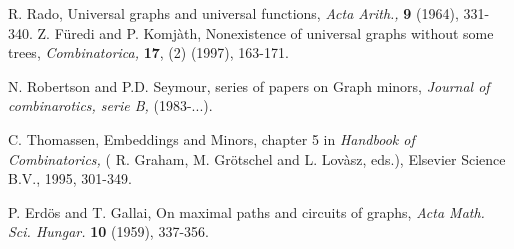\documentclass{llncs}
\begin{document}
\begin{thebibliography}{9}
 R. Rado, Universal graphs and universal functions, \textit{Acta Arith.,} \textbf{9} (1964),
331-340.
 Z. F\"{u}redi and P. Komj\`{a}th, Nonexistence of universal graphs
without some trees, \textit{Combinatorica, }\textbf{17}, (2)
(1997), 163-171.

 N. Robertson and P.D. Seymour, series of papers on Graph
minors, \textit{Journal of combinarotics, serie B, }(1983-...).

 C. Thomassen, Embeddings and Minors, chapter 5 in \textit{Handbook of Combinatorics, }( R. Graham, M.
Gr\"{o}tschel and L. Lov\`{a}sz, eds.), Elsevier Science B.V., 1995,
301-349.

 P. Erd\"{o}s and T. Gallai, On maximal paths and circuits of graphs,
\textit{Acta Math. Sci. Hungar. }\textbf{10} (1959), 337-356.
\end{thebibliography}
\end{document}
